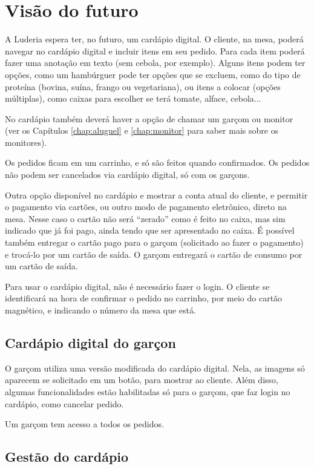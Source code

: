\section{Visão do futuro}

A Luderia espera ter, no futuro, um cardápio digital. O cliente, na mesa, poderá navegar no cardápio digital e incluir itens em seu pedido. Para cada item poderá fazer uma anotação em texto (sem cebola, por exemplo). Alguns itens podem ter opções, como um hambúrguer pode ter opções que se excluem, como do tipo de proteína (bovina, suína, frango ou vegetariana), ou itens a colocar (opções múltiplas), como caixas para escolher se terá tomate, alface, cebola...

No cardápio também deverá haver a opção de chamar um garçom ou monitor (ver os Capítulos \ref{chap:aluguel} e \ref{chap:monitor} para saber mais sobre os monitores).

Os pedidos ficam em um carrinho, e só são feitos quando confirmados. Os pedidos não podem ser cancelados via cardápio digital, só com os garçons.

Outra opção disponível no cardápio e mostrar a conta atual do cliente, e permitir o pagamento via cartões, ou outro modo de pagamento eletrônico, direto na mesa. Nesse caso o cartão não será ``zerado'' como é feito no caixa, mas sim indicado que já foi pago, ainda tendo que ser apresentado no caixa. É possível também entregar o cartão pago para o garçom (solicitado ao fazer o pagamento) e trocá-lo por um cartão de saída. O garçom entregará o cartão de consumo por um cartão de saída.

Para usar o cardápio digital, não é necessário fazer o login. O cliente se identificará na hora de confirmar o pedido no carrinho, por meio do cartão magnético, e indicando o número da mesa que está.

\subsection{Cardápio digital do garçon}

O garçom utiliza uma versão modificada do cardápio digital. Nela, as imagens só aparecem se solicitado em um botão, para mostrar ao cliente. Além disso, algumas funcionalidades estão habilitadas só para o garçom, que faz login no cardápio, como cancelar pedido.

Um garçom tem acesso a todos os pedidos.

\subsection{Gestão do cardápio}

